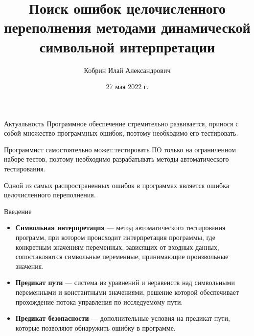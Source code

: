 \documentclass[10pt]{beamer}
\title{Поиск ошибок целочисленного переполнения методами динамической символьной
интерпретации}
\date{27 мая 2022 г.}
\author{Кобрин Илай Александрович}
\institute{МГУ им. М.В. Ломоносова, кафедра системного программирования}
\begin{document}
\maketitle

\begin{frame}{Актуальность}
Программное обеспечение стремительно развивается, принося с собой множество
программных ошибок, поэтому необходимо его тестировать.

Программист самостоятельно может тестировать ПО только на ограниченном наборе
тестов, поэтому необходимо разрабатывать методы автоматического тестирования.

Одной из самых распространенных ошибок в программах является ошибка
целочисленного переполнения.
\end{frame}

\begin{frame}{Введение}
\begin{itemize}
    \item \textbf{Символьная интерпретация} --- метод автоматического тестирования
        программ, при котором происходит интерпретация программы, где конкретным
        значениям переменных, зависящих от входных данных, сопоставляются
        символьные переменные, принимающие произвольные значения.
    \item \textbf{Предикат пути} --- система из уравнений и неравенств над
        символьными переменными и константными значениями, решение которой
        обеспечивает прохождение потока управления по исследуемому пути.
    \item \textbf{Предикат безопасности} --- дополнительные условия на предикат пути,
        которые позволяют обнаружить ошибку в программе.
\end{itemize}
\end{frame}
\end{document}

